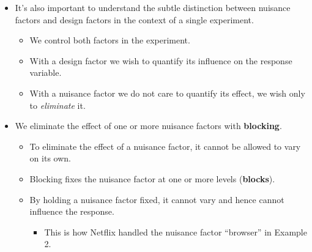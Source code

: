 \begin{itemize}
    \item It's also important to understand the subtle distinction between nuisance factors and design factors in
          the context of a single experiment.
          \begin{itemize}
              \item We control both factors in the experiment.
              \item With a design factor we wish to quantify its influence on the response variable.
              \item With a nuisance factor we do not care to quantify its effect, we wish only to \emph{eliminate} it.
          \end{itemize}
    \item We eliminate the effect of one or more nuisance factors with \textbf{blocking}.
          \begin{itemize}
              \item To eliminate the effect of a nuisance factor, it cannot be allowed to vary on its own.
              \item Blocking fixes the nuisance factor at one or more levels (\textbf{blocks}).
              \item By holding a nuisance factor fixed, it cannot vary and hence cannot influence the response.
                    \begin{itemize}
                        \item This is how Netflix handled the nuisance factor ``browser'' in Example 2.
                    \end{itemize}
          \end{itemize}
\end{itemize}
